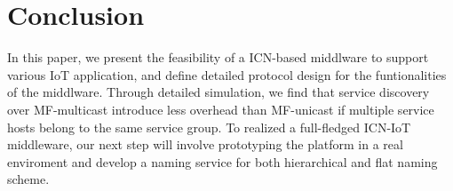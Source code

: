 \section{Conclusion}
In this paper, we present the feasibility of a ICN-based middlware to support various IoT application, and define detailed protocol design for the funtionalities of the middlware. Through detailed simulation, we find that service discovery over MF-multicast introduce less overhead than MF-unicast if multiple service hosts belong to the same service group. To realized a full-fledged ICN-IoT middleware, our next step will involve prototyping the platform in a real enviroment and develop a naming service for both hierarchical and flat naming scheme.    